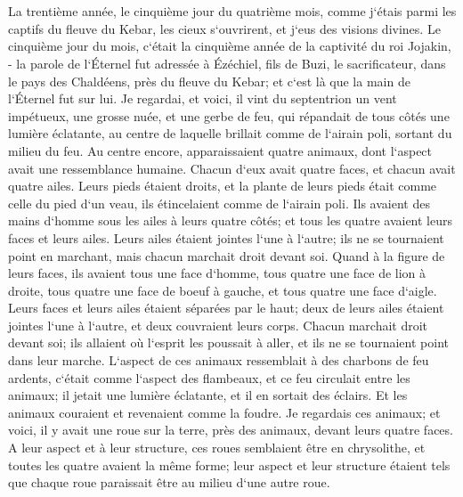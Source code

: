

\chapter{}

\verse La trentième année, le cinquième jour du quatrième mois, comme j`étais parmi les captifs du fleuve du Kebar, les cieux s`ouvrirent, et j`eus des visions divines. 
\verse Le cinquième jour du mois, c`était la cinquième année de la captivité du roi Jojakin, - 
\verse la parole de l`Éternel fut adressée à Ézéchiel, fils de Buzi, le sacrificateur, dans le pays des Chaldéens, près du fleuve du Kebar; et c`est là que la main de l`Éternel fut sur lui. 
\verse Je regardai, et voici, il vint du septentrion un vent impétueux, une grosse nuée, et une gerbe de feu, qui répandait de tous côtés une lumière éclatante, au centre de laquelle brillait comme de l`airain poli, sortant du milieu du feu. 
\verse Au centre encore, apparaissaient quatre animaux, dont l`aspect avait une ressemblance humaine. 
\verse Chacun d`eux avait quatre faces, et chacun avait quatre ailes. 
\verse Leurs pieds étaient droits, et la plante de leurs pieds était comme celle du pied d`un veau, ils étincelaient comme de l`airain poli. 
\verse Ils avaient des mains d`homme sous les ailes à leurs quatre côtés; et tous les quatre avaient leurs faces et leurs ailes. 
\verse Leurs ailes étaient jointes l`une à l`autre; ils ne se tournaient point en marchant, mais chacun marchait droit devant soi. 
\verse Quand à la figure de leurs faces, ils avaient tous une face d`homme, tous quatre une face de lion à droite, tous quatre une face de boeuf à gauche, et tous quatre une face d`aigle. 
\verse Leurs faces et leurs ailes étaient séparées par le haut; deux de leurs ailes étaient jointes l`une à l`autre, et deux couvraient leurs corps. 
\verse Chacun marchait droit devant soi; ils allaient où l`esprit les poussait à aller, et ils ne se tournaient point dans leur marche. 
\verse L`aspect de ces animaux ressemblait à des charbons de feu ardents, c`était comme l`aspect des flambeaux, et ce feu circulait entre les animaux; il jetait une lumière éclatante, et il en sortait des éclairs. 
\verse Et les animaux couraient et revenaient comme la foudre. 
\verse Je regardais ces animaux; et voici, il y avait une roue sur la terre, près des animaux, devant leurs quatre faces. 
\verse A leur aspect et à leur structure, ces roues semblaient être en chrysolithe, et toutes les quatre avaient la même forme; leur aspect et leur structure étaient tels que chaque roue paraissait être au milieu d`une autre roue. 
